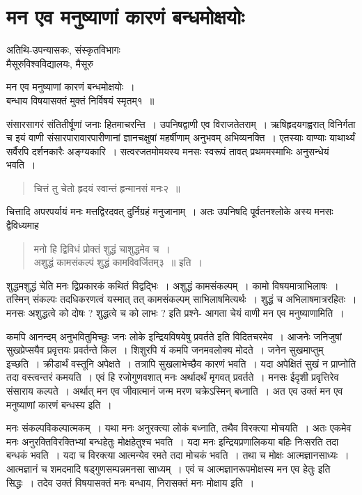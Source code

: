 {\fontsize{15}{17}\selectfont
\presetvalues
\chapter{मन एव मनुष्याणां कारणं बन्धमोक्षयोः}

\begin{center}
\smallskip
अतिथि-उपन्यासकः, संस्कृतविभागः \\
मैसूरुविश्वविद्यालयः, मैसूरु
\addrule
\end{center}

\begin{center}
मन एव मनुष्याणां कारणं बन्धमोक्षयोः~। \\
बन्धाय विषयासक्तं मुक्तं निर्विषयं स्मृतम्१~॥
\end{center}
संसारसागरं संतितीर्षूणां जनाः हितमाचरन्ति~। उपनिषद्वाणी एव विराजतेतराम्~। ऋषिहृदयगह्वरात् विनिर्गता च इयं वाणी संसारपारावारपारीणानां ज्ञानचक्षुषां महर्षीणाम् अनुभवम् अभिव्यनक्ति~। एतस्याः वाण्याः याथार्थ्यं सर्वैरपि दर्शनकारैः अङ्ग्यकारि~। सत्वरजतमोमयस्य मनसः स्वरूपं तावत् प्रथममस्माभिः अनुसन्धेयं भवति~। 
\begin{verse}
चित्तं तु चेतो हृदयं स्वान्तं हृन्मानसं मनः२~॥
\end{verse}
चित्तादि अपरपर्यायं मनः मत्तद्विरदवत् दुर्निग्रहं मनुजानाम्~। अतः उपनिषदि पूर्वतनश्लोके अस्य मनसः द्वैविध्यमाह\enginline{-} 
\begin{verse}
मनो हि द्विविधं प्रोक्तं शुद्धं चाशुद्धमेव च~। \\
अशुद्धं कामसंकल्पं शुद्धं कामविवर्जितम्३~॥ इति~। 
\end{verse}
शुद्धमशुद्धं चेति मनः द्विप्रकारकं कथितं विद्वद्भिः~। अशुद्धं कामसंकल्पम्~। कामो विषयमात्राभिलाषः~। तस्मिन् संकल्पः तदधिकरणत्वं यस्मात् तत् कामसंकल्पम् साभिलाषमित्यर्थः~। शुद्धं च अभिलाषमात्ररहितः~। मनसः अशुद्धत्वे को दोषः ? शुद्धत्वे च को लाभः ? इति प्रश्ने- आगता चेयं वाणी मन एव मनुष्याणामिति~।   

कमपि आनन्दम् अनुभवितुमिच्छुः जनः लोके इन्द्रियविषयेषु प्रवर्तते इति विदितचरमेव~। आजनेः जनिजुषां सुखप्रेप्सयैव प्रवृत्तयः प्रवर्तन्ते किल~। शिशुरपि यं कमपि जनमवलोक्य मोदते~। जनेन सुखमाप्तुम् इच्छति~। क्रीडार्थं वस्तूनि अपेक्षते~। तत्रापि सुखलाभेच्छैव कारणं भवति~। यदा अपेक्षितं सुखं न प्राप्नोति तदा वस्त्वन्तरं कमयति~। एवं हि रजोगुणवशात् मनः अर्थादर्थं मृगवत् प्रवर्तते~। मनसः ईदृशी प्रवृत्तिरेव संसाराय कल्पते~। अर्थात् मन एव जीवात्मानं जन्म मरण चक्रेऽस्मिन् बध्नाति~। अत एव उक्तं मन एव मनुष्याणां कारणं बन्धस्य इति~। 

मनः संकल्पविकल्पात्मकम्~। यथा मनः अनुरक्त्या लोकं बध्नाति, तथैव विरक्त्या मोचयति~। अतः एकमेव मनः अनुरक्तिविरक्तिभ्यां बन्धहेतुः मोक्षहेतुश्च भवति~। यदा मनः इन्द्रियप्रणालिकया बहिः निःसरति तदा बन्धकं भवति~। यदा च विरक्त्या आत्मन्येव रमते तदा मोचकं भवति~। तथा च मोक्षः आत्मज्ञानसाध्यः~। आत्मज्ञानं च शमदमादि षड्गुणसम्पन्नमनसा साध्यम्~। एवं च आत्मज्ञानरूपमोक्षस्य मन एव हेतुः इति सिद्धः~। तदेव उक्तं विषयासक्तं मनः बन्धाय, निरासक्तं मनः मोक्षाय इति~। 

}
